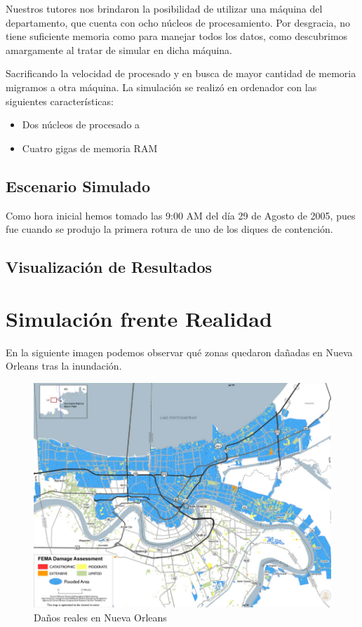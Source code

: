 Nuestros tutores nos brindaron la posibilidad de utilizar una máquina del
departamento, que cuenta con ocho núcleos de procesamiento. Por desgracia, no
tiene suficiente memoria como para manejar todos los datos, como descubrimos
amargamente al tratar de simular en dicha máquina.

Sacrificando la velocidad de procesado y en busca de mayor cantidad de memoria
migramos a otra máquina. La simulación se realizó en ordenador con las
siguientes características:

\begin{itemize}
 \item Dos núcleos de procesado a %
 \item Cuatro gigas de memoria RAM
\end{itemize}

\subsection{Escenario Simulado}



Como hora inicial hemos tomado las 9:00 AM del día 29 de Agosto de 2005, pues
fue cuando se produjo la primera rotura de uno de los diques de
contención\cite{DeLozier}.


\subsection{Visualización de Resultados}
\section{Simulación frente Realidad}

En la siguiente imagen podemos observar qué zonas quedaron dañadas en Nueva
Orleans tras la inundación\cite{Gabe05}.

\begin{figure}[H]
 \centering
 \includegraphics[width=135mm]{figuras/cap6/NOdamage.png}
 \caption{Daños reales en Nueva Orleans}
\end{figure}

